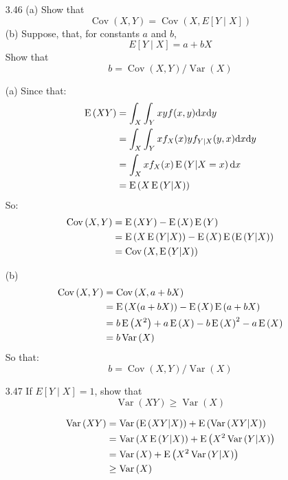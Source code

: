 \documentclass[en,hazy,blue,12pt,device = normal]{elegantnote}
\begin{document}
\begin{enumerate}
    \item[3.46](a) Show that
    $$
    \operatorname{Cov}(X, Y)=\operatorname{Cov}(X, E[Y \mid X])
    $$
    (b) Suppose, that, for constants $a$ and $b$,
    $$
    E[Y \mid X]=a+b X
    $$
    Show that
    $$
    b=\operatorname{Cov}(X, Y) / \operatorname{Var}(X)
    $$

    \begin{tcolorbox}
        \sol

        (a) Since that:
        \begin{align*}
            \mean{XY} &= \int_X\int_Y xyf(x,y)\dd x \dd y \\
            &= \int_X\int_Y xf_X(x)y f_{Y|X} (y,x)\dd x \dd y \\
            &= \int_X xf_X(x)\mean{Y|X = x}\dd x \\
            &= \mean{X\mean{Y|X}}
        \end{align*}
        So:
        \begin{align*}
            \Cov{X,Y} &= \mean{XY} - \mean{X}\mean{Y} \\
            &= \mean{X\mean{Y|X}} - \mean{X}\mean{\mean{Y|X}}\\
            &= \Cov{X, \mean{Y|X}}
        \end{align*}

        (b)
        \begin{align*}
            \Cov{X,Y} &= \Cov{X,a+bX} \\
            &= \mean{X(a+bX)} - \mean{X}\mean{a+bX} \\
            &= b\mean{X^2} +a\mean{X} -b\mean{X}^2 - a\mean{X}\\
            &= b\Var{X}
        \end{align*}
        So that:
        $$
        b=\operatorname{Cov}(X, Y) / \operatorname{Var}(X)
        $$
    \end{tcolorbox}

    \item[3.47] If $E[Y \mid X]=1$, show that
$$
\operatorname{Var}(X Y) \geqslant \operatorname{Var}(X)
$$

    \begin{tcolorbox}
        \sol
        \begin{align*}
            \Var{XY} &= \Var{\mean{XY|X}} + \mean{\Var{XY|X}}\\
            &= \Var{X\mean{Y|X}} + \mean{X^2\Var{Y|X}}\\
            &=\Var{X} + \mean{X^2\Var{Y|X}}\\
            &\geq \Var{X}
        \end{align*}


\end{tcolorbox}
\end{enumerate}
\end{document}
